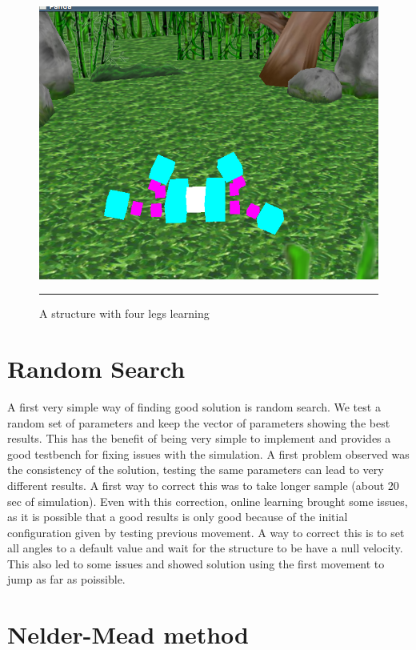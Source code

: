\begin{figure}[htbp]
    \centering
    \includegraphics[scale=0.5]{Figures/four_legged.png}
    \rule{35em}{0.5pt}
    \caption[A structure with four legs learning]{A structure with four legs learning}
    \label{fig:four_legged}
\end{figure}

\section{Random Search}

A first very simple way of finding good solution is random search. We test a random set of parameters and keep the vector of parameters showing the best results. This has the benefit of being very simple to implement and provides a good testbench for fixing issues with the simulation. A first problem observed was the consistency of the solution, testing the same parameters can lead to very different results. A first way to correct this was to take longer sample (about 20 sec of simulation). Even with this correction, online learning brought some issues, as it is possible that a good results is only good because of the initial configuration given by testing previous movement. A way to correct this is to set all angles to a default value and wait for the structure to be have a null velocity. This also led to some issues and showed solution using the first movement to jump as far as poissible. 


\section{Nelder-Mead method}

